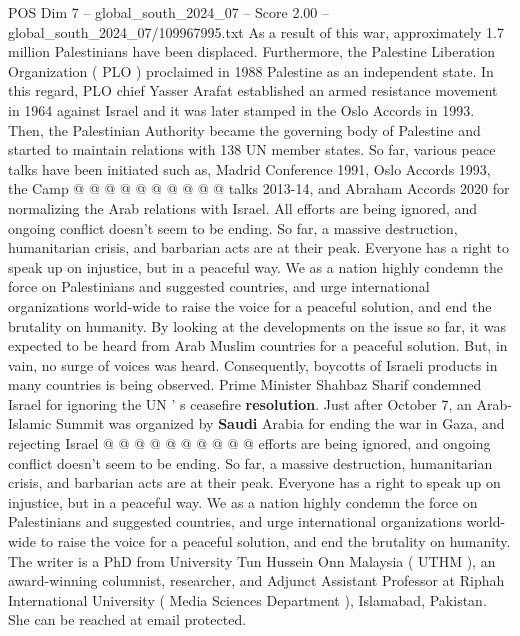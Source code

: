 \begin{textsample}{POS Dim 7 – global\_south\_2024\_07 – Score 2.00 – global\_south\_2024\_07/109967995.txt}
As a result of this war, approximately 1.7 million Palestinians have been displaced.
Furthermore, the Palestine Liberation Organization ( PLO ) proclaimed in 1988 Palestine as an independent state.
In this regard, PLO chief Yasser Arafat established an armed resistance movement in 1964 against Israel and it was later stamped in the Oslo Accords in 1993.
Then, the Palestinian Authority became the governing body of Palestine and started to maintain relations with 138 UN member states.
So far, various peace talks have been initiated such as, Madrid Conference 1991, Oslo Accords 1993, the Camp @ @ @ @ @ @ @ @ @ @ talks 2013-14, and Abraham Accords 2020 for normalizing the Arab relations with Israel.
All efforts are being ignored, and ongoing conflict doesn't seem to be ending.
So far, a massive destruction, humanitarian crisis, and barbarian acts are at their peak.
Everyone has a right to speak up on injustice, but in a peaceful way.
We as a nation highly condemn the force on Palestinians and suggested countries, and urge international organizations world-wide to raise the voice for a peaceful solution, and end the brutality on humanity.
By looking at the developments on the issue so far, it was expected to be heard from Arab Muslim countries for a peaceful solution.
But, in vain, no surge of voices was heard.
Consequently, boycotts of Israeli products in many countries is being observed.
Prime Minister Shahbaz Sharif condemned Israel for ignoring the UN ' s ceasefire \textbf{resolution}.
Just after October 7, an Arab-Islamic Summit was organized by \textbf{Saudi} Arabia for ending the war in Gaza, and rejecting Israel @ @ @ @ @ @ @ @ @ @ efforts are being ignored, and ongoing conflict doesn't seem to be ending.
So far, a massive destruction, humanitarian crisis, and barbarian acts are at their peak.
Everyone has a right to speak up on injustice, but in a peaceful way.
We as a nation highly condemn the force on Palestinians and suggested countries, and urge international organizations world-wide to raise the voice for a peaceful solution, and end the brutality on humanity.
The writer is a PhD from University Tun Hussein Onn Malaysia ( UTHM ), an award-winning columnist, researcher, and Adjunct Assistant Professor at Riphah International University ( Media Sciences Department ), Islamabad, Pakistan.
She can be reached at email protected.

\end{textsample}
